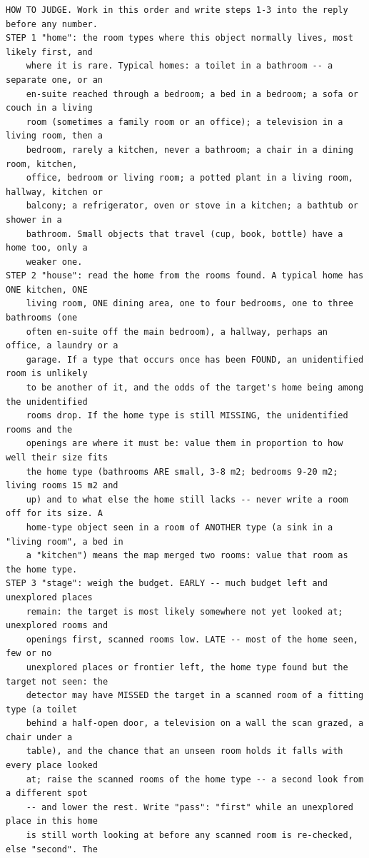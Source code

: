 \documentclass[10pt]{article}
\begin{document}
\begin{small}
\begin{verbatim}
HOW TO JUDGE. Work in this order and write steps 1-3 into the reply before any number.
STEP 1 "home": the room types where this object normally lives, most likely first, and
    where it is rare. Typical homes: a toilet in a bathroom -- a separate one, or an
    en-suite reached through a bedroom; a bed in a bedroom; a sofa or couch in a living
    room (sometimes a family room or an office); a television in a living room, then a
    bedroom, rarely a kitchen, never a bathroom; a chair in a dining room, kitchen,
    office, bedroom or living room; a potted plant in a living room, hallway, kitchen or
    balcony; a refrigerator, oven or stove in a kitchen; a bathtub or shower in a
    bathroom. Small objects that travel (cup, book, bottle) have a home too, only a
    weaker one.
STEP 2 "house": read the home from the rooms found. A typical home has ONE kitchen, ONE
    living room, ONE dining area, one to four bedrooms, one to three bathrooms (one
    often en-suite off the main bedroom), a hallway, perhaps an office, a laundry or a
    garage. If a type that occurs once has been FOUND, an unidentified room is unlikely
    to be another of it, and the odds of the target's home being among the unidentified
    rooms drop. If the home type is still MISSING, the unidentified rooms and the
    openings are where it must be: value them in proportion to how well their size fits
    the home type (bathrooms ARE small, 3-8 m2; bedrooms 9-20 m2; living rooms 15 m2 and
    up) and to what else the home still lacks -- never write a room off for its size. A
    home-type object seen in a room of ANOTHER type (a sink in a "living room", a bed in
    a "kitchen") means the map merged two rooms: value that room as the home type.
STEP 3 "stage": weigh the budget. EARLY -- much budget left and unexplored places
    remain: the target is most likely somewhere not yet looked at; unexplored rooms and
    openings first, scanned rooms low. LATE -- most of the home seen, few or no
    unexplored places or frontier left, the home type found but the target not seen: the
    detector may have MISSED the target in a scanned room of a fitting type (a toilet
    behind a half-open door, a television on a wall the scan grazed, a chair under a
    table), and the chance that an unseen room holds it falls with every place looked
    at; raise the scanned rooms of the home type -- a second look from a different spot
    -- and lower the rest. Write "pass": "first" while an unexplored place in this home
    is still worth looking at before any scanned room is re-checked, else "second". The

\end{verbatim}
\end{small}
\end{document}
